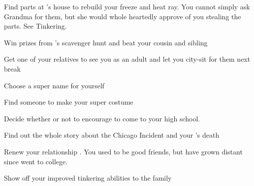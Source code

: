 \documentclass[char]{LRSguildcamp1}
\begin{document}
 
\begin{itemz}[Goals]
	\item Find parts at \cGrandma{}'s house to rebuild your freeze and heat ray. You cannot simply ask Grandma for them, but she would whole heartedly approve of you stealing the parts. See Tinkering. 
	\item Win prizes from \cGrandma{}'s scavenger hunt and beat your cousin and sibling
	
		\item Get one of your relatives to see you as an adult and let you city-sit for them next break
		
		\item Choose a super name for yourself
		
		\item Find someone to make your super costume 
		
		\item Decide whether or not to encourage \cTween{} to come to your high school.
		
		\item Find out the whole story about the Chicago Incident and your \cAS{\paren}'s death
		
		\item Renew your relationship \cGrad{}. You used to be good friends, but have grown distant since \cGrad{} went to college.
		
		\item Show off your improved tinkering abilities to the family
		
\end{itemz}
\end{document}
